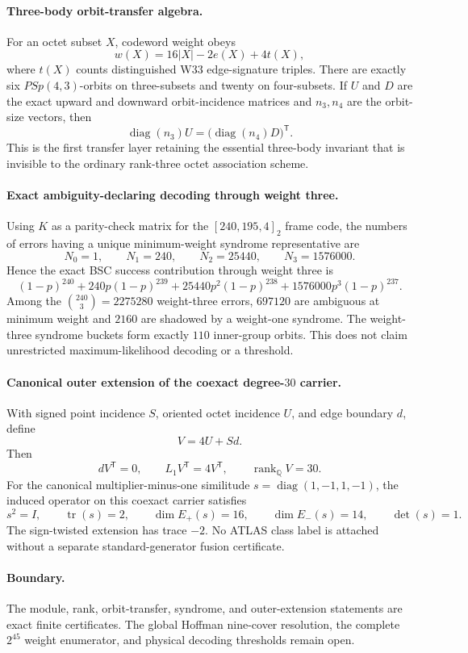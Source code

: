 \paragraph{Three-body orbit-transfer algebra.}
For an octet subset $X$, codeword weight obeys
\[
 w(X)=16|X|-2e(X)+4t(X),
\]
where $t(X)$ counts distinguished W33 edge-signature triples.  There are
exactly six $PSp(4,3)$-orbits on three-subsets and twenty on four-subsets.
If $U$ and $D$ are the exact upward and downward orbit-incidence matrices and
$n_3,n_4$ are the orbit-size vectors, then
\[
 \operatorname{diag}(n_3)U
 =\bigl(\operatorname{diag}(n_4)D\bigr)^{\mathsf T}.
\]
This is the first transfer layer retaining the essential three-body invariant
that is invisible to the ordinary rank-three octet association scheme.

\paragraph{Exact ambiguity-declaring decoding through weight three.}
Using $K$ as a parity-check matrix for the $[240,195,4]_2$ frame code, the
numbers of errors having a unique minimum-weight syndrome representative are
\[
 N_0=1,
 \qquad N_1=240,
 \qquad N_2=25440,
 \qquad N_3=1576000.
\]
Hence the exact BSC success contribution through weight three is
\[
 (1-p)^{240}
 +240p(1-p)^{239}
 +25440p^2(1-p)^{238}
 +1576000p^3(1-p)^{237}.
\]
Among the $\binom{240}{3}=2275280$ weight-three errors, $697120$ are
ambiguous at minimum weight and $2160$ are shadowed by a weight-one syndrome.
The weight-three syndrome buckets form exactly $110$ inner-group orbits.
This does not claim unrestricted maximum-likelihood decoding or a threshold.

\paragraph{Canonical outer extension of the coexact degree-$30$ carrier.}
With signed point incidence $S$, oriented octet incidence $U$, and edge
boundary $d$, define
\[
 V=4U+Sd.
\]
Then
\[
 dV^{\mathsf T}=0,
 \qquad
 L_1V^{\mathsf T}=4V^{\mathsf T},
 \qquad
 \operatorname{rank}_{\mathbb Q}V=30.
\]
For the canonical multiplier-minus-one similitude
$s=\operatorname{diag}(1,-1,1,-1)$, the induced operator on this coexact
carrier satisfies
\[
 s^2=I,
 \qquad
 \operatorname{tr}(s)=2,
 \qquad
 \dim E_+(s)=16,
 \qquad
 \dim E_-(s)=14,
 \qquad
 \det(s)=1.
\]
The sign-twisted extension has trace $-2$.  No ATLAS class label is attached
without a separate standard-generator fusion certificate.

\paragraph{Boundary.}
The module, rank, orbit-transfer, syndrome, and outer-extension statements are
exact finite certificates.  The global Hoffman nine-cover resolution, the
complete $2^{45}$ weight enumerator, and physical decoding thresholds remain
open.
